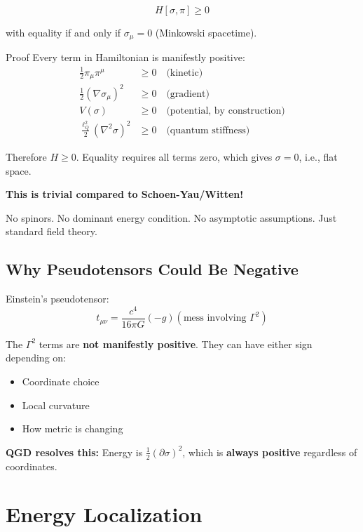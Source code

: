 \documentclass[11pt,a4paper]{article}
\theoremstyle{definition}
\theoremstyle{remark}
\begin{document}
		\begin{equation}
			\boxed{H[\sigma, \pi] \geq 0}
		\end{equation}
		
		with equality if and only if $\sigma_\mu = 0$ (Minkowski spacetime).
	
	Proof
		Every term in Hamiltonian is manifestly positive:
		\begin{align}
			\frac{1}{2}\pi_\mu\pi^\mu &\geq 0 \quad \text{(kinetic)}\\
			\frac{1}{2}(\nabla\sigma_\mu)^2 &\geq 0 \quad \text{(gradient)}\\
			V(\sigma) &\geq 0 \quad \text{(potential, by construction)}\\
			\frac{\ell_Q^2}{2}(\nabla^2\sigma)^2 &\geq 0 \quad \text{(quantum stiffness)}
		\end{align}
		
		Therefore $H \geq 0$. Equality requires all terms zero, which gives $\sigma = 0$, i.e., flat space.
	
	\textbf{This is trivial compared to Schoen-Yau/Witten!}
	
	No spinors. No dominant energy condition. No asymptotic assumptions. Just standard field theory.
	
	\subsection{Why Pseudotensors Could Be Negative}
	
	Einstein's pseudotensor:
	\begin{equation}
		t_{\mu\nu} = \frac{c^4}{16\pi G}(-g)(\text{mess involving } \Gamma^2)
	\end{equation}
	
	The $\Gamma^2$ terms are \textbf{not manifestly positive}. They can have either sign depending on:
	\begin{itemize}
		\item Coordinate choice
		\item Local curvature
		\item How metric is changing
	\end{itemize}
	
	\textbf{QGD resolves this:} Energy is $\frac{1}{2}(\partial\sigma)^2$, which is \textbf{always positive} regardless of coordinates.
	
	\section{Energy Localization}
	
\end{document}
